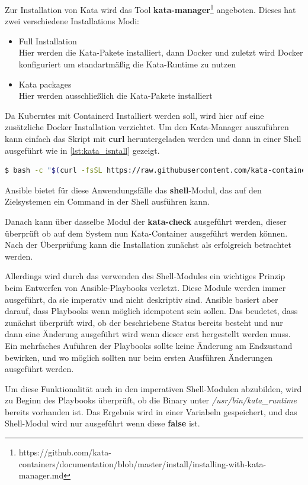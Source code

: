 Zur Installation von Kata wird das Tool \textbf{kata-manager}\footnote{https://github.com/kata-containers/documentation/blob/master/install/installing-with-kata-manager.md} angeboten. 
Dieses hat zwei verschiedene Installations Modi:
\begin{itemize}
    \item Full Installation \\ Hier werden die Kata-Pakete installiert, dann Docker und zuletzt wird Docker konfiguriert um standartmäßig die Kata-Runtime zu nutzen
    \item Kata packages \\ Hier werden ausschließlich die Kata-Pakete installiert
\end{itemize}
Da Kuberntes mit Containerd Installiert werden soll, wird hier auf eine zusätzliche Docker Installation verzichtet.
Um den Kata-Manager auszuführen kann einfach das Skript mit \textbf{curl} heruntergeladen werden und dann in einer Shell ausgeführt wie in \ref{lst:kata_isntall} gezeigt.
\begin{lstlisting}[language=bash, caption={Kata Installation}, label={lst:kata_isntall}]
$ bash -c "$(curl -fsSL https://raw.githubusercontent.com/kata-containers/tests/master/cmd/kata-manager/kata-manager.sh) install-packages"
\end{lstlisting}
Ansible bietet für diese Anwendungsfälle das \textbf{shell}-Modul, das auf den Zielsystemen ein Command in der Shell ausführen kann. 

Danach kann über dasselbe Modul der \textbf{kata-check} ausgeführt werden, dieser überprüft ob auf dem System nun Kata-Container ausgeführt werden können.
Nach der Überprüfung kann die Installation zunächst als erfolgreich betrachtet werden.

Allerdings wird durch das verwenden des Shell-Modules ein wichtiges Prinzip beim Entwerfen von Ansible-Playbooks verletzt. 
Diese Module werden immer ausgeführt, da sie imperativ und nicht deskriptiv sind. 
Ansible basiert aber darauf, dass Playbooks wenn möglich idempotent sein sollen.
Das beudetet, dass zunächst überprüft wird, ob der beschriebene Status bereits besteht und nur dann eine Änderung ausgeführt wird wenn dieser erst hergestellt werden muss. \cite{ansibel_idempotency}
Ein mehrfaches Auführen der Playbooks sollte keine Änderung am Endzustand bewirken, und wo möglich sollten nur beim ersten Ausführen Änderungen ausgeführt werden. 

Um diese Funktionalität auch in den imperativen Shell-Modulen abzubilden, wird zu Beginn des Playbooks überprüft, ob die Binary unter \textit{/usr/bin/kata\_runtime} bereits vorhanden ist. 
Das Ergebnis wird in einer Variabeln gespeichert, und das Shell-Modul wird nur ausgeführt wenn diese \textbf{false} ist. 

